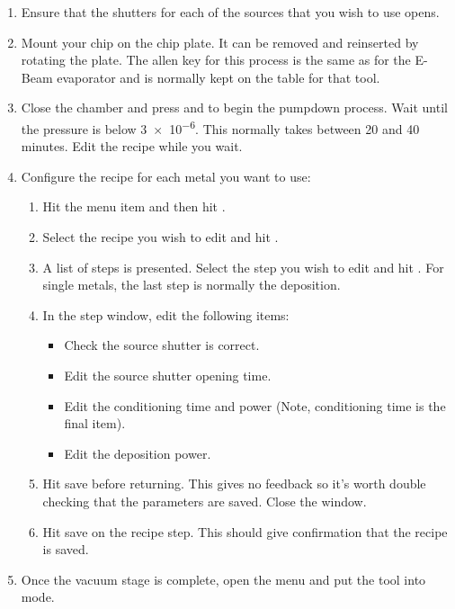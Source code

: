 \begin{enumerate}
\begin{enumerate} 
  \item Close the shutter by pressing the  button again.
\end{enumerate}
\item Ensure that the shutters for each of the sources that you wish to use opens.
\item Mount your chip on the chip plate. It can be removed and reinserted by rotating the plate. The allen key for this process is the same as for the E-Beam evaporator
      and is normally kept on the table for that tool.
\item Close the chamber and press  and  to begin the pumpdown process. Wait until the pressure is below \SI{3e-6}{\torr}. This normally takes between 20 and 40 minutes.
      Edit the recipe while you wait.
\item Configure the recipe for each metal you want to use:
\begin{enumerate}  %
  \item Hit the  menu item and then hit .
  \item Select the recipe you wish to edit and hit .
  \item A list of steps is presented. Select the step you wish to edit and hit . For single metals, the last step is normally the deposition.
  \item In the step window, edit the following items:
  \begin{itemize} [noitemsep, nolistsep]
    \item Check the source shutter is correct.
    \item Edit the source shutter opening time.
    \item Edit the conditioning time and power (Note, conditioning time is the final item).
    \item Edit the deposition power.
  \end{itemize}
  \item Hit save before returning. This gives no feedback so it's worth double checking that the parameters are saved. Close the window.
  \item Hit save on the recipe step. This should give confirmation that the recipe is saved.
\end{enumerate}
\item Once the vacuum stage is complete, open the  menu and put the tool into  mode.

\end{enumerate}
